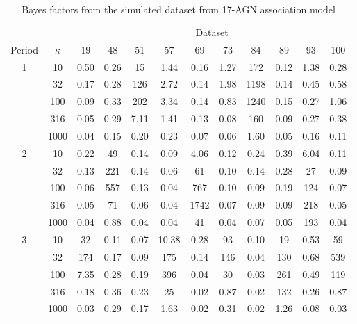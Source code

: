 \begin{table}[h]
\begin{tabular}{|c|c |c| c| c| c|c|c|c|c|c|c|}
\hline
 & & \multicolumn{10}{|c|}{Dataset}\\
\cline{3-12}
Period & $\kappa$ & 19 & 48 & 51 & 57 & 69 & 73 & 84 & 89 & 93 & 100\\
\hline
1 & 10 & 0.50 & 0.26 & 15 & 1.44 & 0.16 & 1.27 & 172 & 0.12 & 1.38 & 0.28\\
   & 32 & 0.17 & 0.28 & 126 & 2.72 & 0.14 & 1.98 & 1198 & 0.14 & 0.45 & 0.58\\
   & 100 & 0.09& 0.33 & 202 & 3.34 & 0.14 & 0.83 & 1240 & 0.15 & 0.27 & 1.06\\
   & 316 & 0.05 & 0.29 & 7.11 & 1.41 & 0.13 & 0.08 & 160 & 0.09 & 0.27 & 0.38\\
   & 1000 & 0.04 & 0.15 & 0.20 & 0.23 & 0.07& 0.06 &  1.60 & 0.05 & 0.16 & 0.11\\
\hline
2 & 10 & 0.22 & 49 & 0.14 & 0.09 & 4.06 & 0.12 & 0.24 & 0.39 & 6.04 & 0.11\\
   & 32 & 0.13 & 221 & 0.14 & 0.06 & 61 & 0.10 & 0.14 & 0.28 & 27 & 0.09\\
   & 100 & 0.06 & 557 & 0.13 & 0.04 & 767 & 0.10 & 0.09 & 0.19 & 124 & 0.07\\
   & 316 & 0.05 & 71 & 0.06 & 0.04 & 1742 & 0.07 & 0.09 & 0.09 & 218 & 0.05\\
   & 1000& 0.04 & 0.88 & 0.04 & 0.04 & 41 & 0.04 & 0.07 & 0.05 & 193 & 0.04\\
\hline
3 & 10 & 32 & 0.11 & 0.07 & 10.38 & 0.28 & 93 & 0.10 & 19 & 0.53 & 59\\
   & 32 & 174 & 0.17 & 0.09 & 175 & 0.14 & 146 & 0.04 & 130 & 0.68 & 539\\
   & 100 & 7.35 & 0.28 & 0.19 & 396 & 0.04 & 30 & 0.03 & 261 & 0.49 & 119\\
   & 316 & 0.18 & 0.36 & 0.23 & 25 & 0.02 & 0.87 & 0.02 & 132 & 0.26 & 0.87\\
   & 1000 & 0.03 & 0.29 & 0.17 & 1.63 & 0.02 & 0.31 & 0.02 & 1.26 & 0.08 & 0.03\\
\hline
\end{tabular}
\caption{Bayes factors from the simulated dataset from 17-AGN association model}\label{tab:BFsim}
\end{table}
